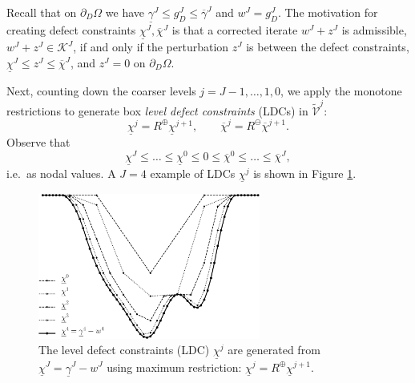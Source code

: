 \documentclass[letterpaper,final,12pt,reqno]{amsart}
\theoremstyle{cstyle}
\theoremstyle{cstyle*}
\theoremstyle{dstyle}
\numberwithin{equation}{section}
\numberwithin{figure}{section}
\numberwithin{table}{section}
\numberwithin{theorem}{section}
\newcommand{\cK}{\mathcal{K}}
\newcommand{\maxR}{R^{\bm{\oplus}}}
\newcommand{\minR}{R^{\bm{\ominus}}}
\begin{document}
Recall that on $\partial_D\Omega$ we have $\underline{\gamma}^J \le g_D^J \le \overline{\gamma}^J$ and $w^J = g_D^J$.  The motivation for creating defect constraints $\underline{\chi}^J,\overline{\chi}^J$ is that a corrected iterate $w^J + z^J$ is admissible, $w^J + z^J \in \cK^J$, if and only if the perturbation $z^J$ is between the defect constraints, $\underline{\chi}^J \le z^J \le \overline{\chi}^J$, and $z^J=0$ on $\partial_D\Omega$.

Next, counting down the coarser levels $j=J-1,\dots,1,0$, we apply the monotone restrictions to generate box \emph{level defect constraints} (LDCs) in $\tilde{\mathcal{V}}^j$:
\begin{equation}
\underline{\chi}^{j} = \maxR \underline{\chi}^{j+1}, \qquad \overline{\chi}^{j} = \minR \overline{\chi}^{j+1}. \label{eq:fe:chilevels}
\end{equation}
Observe that
\begin{equation}
\underline{\chi}^{J} \le \dots \le \underline{\chi}^0 \le 0 \le \overline{\chi}^0 \le \dots \le \overline{\chi}^J, \label{eq:fe:chiordering}
\end{equation}
i.e.~as nodal values.  A $J=4$ example of LDCs $\underline{\chi}^j$ is shown in Figure \ref{fig:chiphilevels}.

\begin{figure}[ht]
\includegraphics[width=0.65\textwidth]{fixfigs/chiphilevels.pdf}
\caption{The level defect constraints (LDC) $\underline{\chi}^j$ are generated from $\underline{\chi}^J = \underline{\gamma}^J - w^J$ using maximum restriction: $\underline{\chi}^j = \maxR \underline{\chi}^{j+1}$.}
\label{fig:chiphilevels}
\end{figure}
\end{document}
